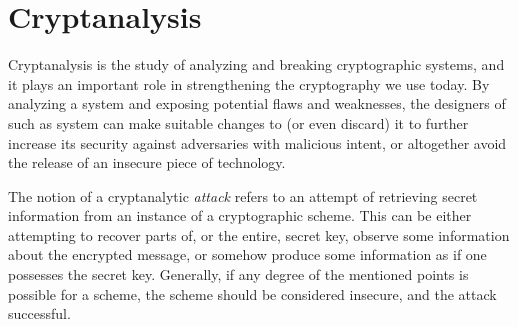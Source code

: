 
\section{Cryptanalysis}
Cryptanalysis is the study of analyzing and breaking cryptographic systems, and it plays an important role in strengthening the cryptography we use today.
By analyzing a system and exposing potential flaws and weaknesses, the designers of such as system can make suitable changes to (or even discard) it to further 
increase its security against adversaries with malicious intent, or altogether avoid the release of an insecure piece of technology.

The notion of a cryptanalytic \textit{attack} refers to an attempt of retrieving secret information from an instance of a cryptographic scheme.
This can be either attempting to recover parts of, or the entire, secret key, observe some information about the encrypted message, or somehow produce 
some information as if one possesses the secret key. Generally, if any degree of the mentioned points is possible for a scheme, the scheme should be considered insecure, and the attack successful.

